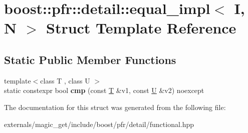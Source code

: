 \hypertarget{structboost_1_1pfr_1_1detail_1_1equal__impl}{}\section{boost\+:\+:pfr\+:\+:detail\+:\+:equal\+\_\+impl$<$ I, N $>$ Struct Template Reference}
\label{structboost_1_1pfr_1_1detail_1_1equal__impl}
\subsection*{Static Public Member Functions}
\begin{DoxyCompactItemize}
\item 
\mbox{\label{structboost_1_1pfr_1_1detail_1_1equal__impl_a8c0f4614ec6e9d39411f07381e45fee7}} 
{\footnotesize template$<$class T , class U $>$ }\\static constexpr bool {\bfseries cmp} (const \mbox{\hyperlink{struct_t}{T}} \&v1, const \mbox{\hyperlink{union_u}{U}} \&v2) noexcept
\end{DoxyCompactItemize}


The documentation for this struct was generated from the following file\+:\begin{DoxyCompactItemize}
\item 
externals/magic\+\_\+get/include/boost/pfr/detail/functional.\+hpp\end{DoxyCompactItemize}

